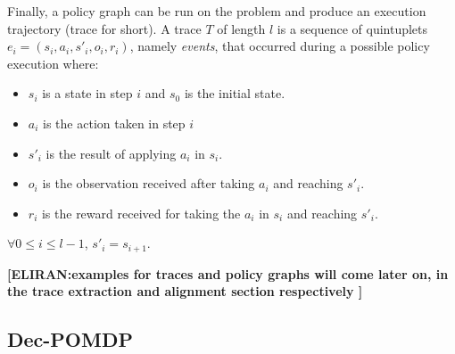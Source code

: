 \documentclass[letterpaper]{article} %
\newcommand{\eliran}[1]{\textbf{[\color{red}ELIRAN:#1]}}
\begin{document}
Finally, a policy graph can be run on the problem and produce an execution trajectory (trace for short). A trace $T$ of length $l$ is a sequence of quintuplets $e_i = (s_i, a_i, s'_i, o_i, r_i)$, namely \emph{events}, that occurred during a possible policy execution where:
\begin{itemize}
    \item $s_i$ is a state in step $i$ and $s_0$ is the initial state.
    \item $a_i$ is the action taken in step $i$
    \item $s'_i$ is the result of applying
    $a_i$ in $s_i$.
    \item $o_i$ is the observation received after taking $a_i$ and reaching $s'_i$.
    \item $r_i$ is the reward received for taking the $a_i$ in $s_i$ and reaching $s'_i$.
\end{itemize}
$\forall 0\leq i \leq l-1$, $s'_i=s_{i+1}$.

\eliran{examples for traces and policy graphs will come later on, in the trace extraction and alignment section respectively
}

\subsection{Dec-POMDP}
\end{document}
